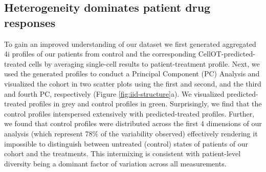 \subsection{Heterogeneity dominates patient drug responses}
To gain an improved understanding of our dataset we first generated aggregated 4i profiles of our patients from control and the corresponding CellOT-predicted-treated cells by averaging single-cell results to patient-treatment profile.
Next, we used the generated profiles to conduct a Principal Component (PC) Analysis and visualized the cohort in two scatter plots using the first and second, and the third and fourth PC, respectively (Figure \ref{fig:iid-structure}a).
We visualized predicted-treated profiles in grey and control profiles in green.
Surprisingly, we find that the control profiles interspersed extensively with predicted-treated profiles.
Further, we found that control profiles were distributed across the first 4 dimensions of our analysis (which represent 78\% of the variability observed) effectively rendering it impossible to distinguish between untreated (control) states of patients of our cohort and the treatments.
This intermixing is consistent with patient-level diversity being a dominant factor of variation across all measurements.

